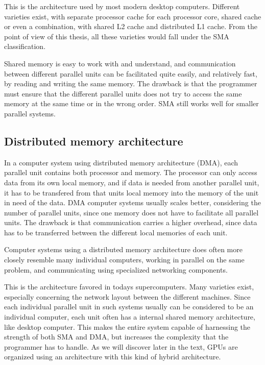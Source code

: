 This is the architecture used by most modern desktop computers. Different varieties exist, with separate processor cache for each processor core, shared cache or even a combination, with shared L2 cache and distributed L1 cache. From the point of view of this thesis, all these varieties would fall under the SMA classification.

Shared memory is easy to work with and understand, and communication between different parallel units can be facilitated quite easily, and relatively fast, by reading and writing the same memory. The drawback is that the programmer must ensure that the different parallel units does not try to access the same memory at the same time or in the wrong order. SMA still works well for smaller parallel systems.

\subsection{Distributed memory architecture} %
\label{sub:distributed_memory_architecture}

In a computer system using distributed memory architecture (DMA), each parallel unit contains both processor and memory. The processor can only access data from its own local memory, and if data is needed from another parallel unit, it has to be transfered from that units local memory into the memory of the unit in need of the data. DMA computer systems usually scales better, considering the number of parallel units, since one memory does not have to facilitate all parallel units. The drawback is that communication carries a higher overhead, since data has to be transferred between the different local memories of each unit.

Computer systems using a distributed memory architecture does often more closely resemble many individual computers, working in parallel on the same problem, and communicating using specialized networking components.

This is the architecture favored in todays supercomputers. Many varieties exist, especially concerning the network layout between the different machines. Since each individual parallel unit in such systems usually can be considered to be an individual computer, each unit often has a internal shared memory architecture, like desktop computer. This makes the entire system capable of harnessing the strength of both SMA and DMA, but increases the complexity that the programmer has to handle. As we will discover later in the text, GPUs are organized using an architecture with this kind of hybrid architecture.

